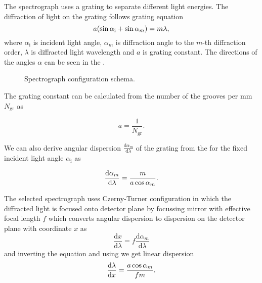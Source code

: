 The spectrograph uses a grating to separate different light energies. The
diffraction of light on the grating follows grating equation
\begin{equation}
	a(\sin\alpha_\text{i} + \sin\alpha_m) = m\lambda,
	\label{\eqnlabel{spectrograph_selection:grating_equation}}
\end{equation}
where $\alpha_\text{i}$ is incident light angle, $\alpha_m$ is diffraction
angle to the $m$-th diffraction order, $\lambda$ is diffracted light wavelength
and $a$ is grating constant. The directions of the angles $\alpha$ can be seen
in the
.

\begin{figure}
	\centering
	
	\caption{Spectrograph configuration schema.}
	\label{\figlabel{spectrograph_selection:configuration_schema}}
\end{figure}

The grating constant can be calculated from the number of the grooves per mm
$N_\text{gr}$ as

\begin{equation*}
	a = \frac{1}{N_\text{gr}}.
\end{equation*}

We can also derive angular dispersion
$\frac{\text{d}\alpha_m}{\text{d}\lambda}$
of the grating from the
for the fixed incident light angle $\alpha_\text{i}$ as

\begin{equation}
	\frac{\text{d}\alpha_m}{\text{d}\lambda} = \frac{m}{a\cos\alpha_m}.
	\label{\eqnlabel{spectrograph_selection:angular_dispersion}}
\end{equation}

The selected spectrograph uses Czerny-Turner configuration in which the
diffracted light is focused onto detector plane by focussing mirror with
effective focal length $f$ which converts angular dispersion to dispersion on
the detector plane with coordinate $x$ as
\begin{equation*}
	\frac{\text{d}x}{\text{d}\lambda} =
		f\frac{\text{d}\alpha_m}{\text{d}\lambda}
\end{equation*}
and inverting the equation and using
we get linear dispersion
\begin{equation}
	\frac{\text{d}\lambda}{\text{d}x} = \frac{a\cos\alpha_m}{fm}.
	\label{\eqnlabel{spectrograph_selection:linear_dispersion}}
\end{equation}

